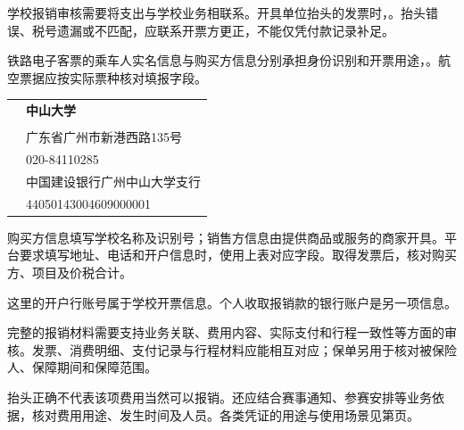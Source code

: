 学校报销审核需要将支出与学校业务相联系。开具单位抬头的发票时，。抬头错误、税号遗漏或不匹配，应联系开票方更正，不能仅凭付款记录补足。

铁路电子客票的乘车人实名信息与购买方信息分别承担身份识别和开票用途，。航空票据应按实际票种核对填报字段。
\label{invoice-title}

\begin{PurchaserBox}\par\vspace{6pt}
\begin{tabularx}{\linewidth}{@{}p{29mm}Y@{}}
 & {\bfseries\fontsize{13.5}{19}\selectfont 中山大学} \\[5pt]
 & {\bfseries\fontsize{13.5}{19}} \\[5pt]
 & 广东省广州市新港西路135号 \\[5pt]
 & 020-84110285 \\[5pt]
 & 中国建设银行广州中山大学支行 \\[5pt]
 & 44050143004609000001 \\[5pt]
\end{tabularx}
\end{PurchaserBox}
\begin{TeachingPair}
购买方信息填写学校名称及识别号；销售方信息由提供商品或服务的商家开具。平台要求填写地址、电话和开户信息时，使用上表对应字段。取得发票后，核对购买方、项目及价税合计。\SideColumn
\begin{SideNote}
这里的开户行账号属于学校开票信息。个人收取报销款的银行账户是另一项信息。

\end{SideNote}
\end{TeachingPair}
完整的报销材料需要支持业务关联、费用内容、实际支付和行程一致性等方面的审核。发票、消费明细、支付记录与行程材料应能相互对应；保单另用于核对被保险人、保障期间和保障范围。

\begin{SummaryBox}
抬头正确不代表该项费用当然可以报销。还应结合赛事通知、参赛安排等业务依据，核对费用用途、发生时间及人员。各类凭证的用途与使用场景见第页。
\end{SummaryBox}

